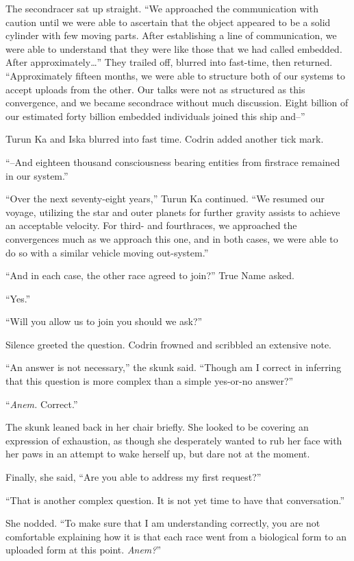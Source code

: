 The secondracer sat up straight. ``We approached the communication with caution until we were able to ascertain that the object appeared to be a solid cylinder with few moving parts. After establishing a line of communication, we were able to understand that they were like those that we had called embedded. After approximately\ldots{}'' They trailed off, blurred into fast-time, then returned. ``Approximately fifteen months, we were able to structure both of our systems to accept uploads from the other. Our talks were not as structured as this convergence, and we became secondrace without much discussion. Eight billion of our estimated forty billion embedded individuals joined this ship and--''

Turun Ka and Iska blurred into fast time. Codrin added another tick mark.

``--And eighteen thousand consciousness bearing entities from firstrace remained in our system.''

``Over the next seventy-eight years,'' Turun Ka continued. ``We resumed our voyage, utilizing the star and outer planets for further gravity assists to achieve an acceptable velocity. For third- and fourthraces, we approached the convergences much as we approach this one, and in both cases, we were able to do so with a similar vehicle moving out-system.''

``And in each case, the other race agreed to join?'' True Name asked.

``Yes.''

``Will you allow us to join you should we ask?''

Silence greeted the question. Codrin frowned and scribbled an extensive note.

``An answer is not necessary,'' the skunk said. ``Though am I correct in inferring that this question is more complex than a simple yes-or-no answer?''

``\emph{Anem.} Correct.''

The skunk leaned back in her chair briefly. She looked to be covering an expression of exhaustion, as though she desperately wanted to rub her face with her paws in an attempt to wake herself up, but dare not at the moment.

Finally, she said, ``Are you able to address my first request?''

``That is another complex question. It is not yet time to have that conversation.''

She nodded. ``To make sure that I am understanding correctly, you are not comfortable explaining how it is that each race went from a biological form to an uploaded form at this point. \emph{Anem?}''

